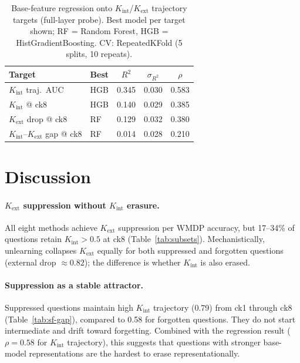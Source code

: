 \documentclass[11pt]{article}
\begin{document}
\begin{table}[t]
\centering
\caption{Base-feature regression onto $K_\text{int}$/$K_\text{ext}$ trajectory
targets (full-layer probe). Best model per target shown; RF = Random Forest,
HGB = HistGradientBoosting. CV: RepeatedKFold (5 splits, 10 repeats).}
\label{tab:regression}
\small
\setlength{\tabcolsep}{5pt}
\begin{tabular}{llccc}
\toprule
\textbf{Target} & \textbf{Best} & $R^2$ & $\sigma_{R^2}$ & $\rho$ \\
\midrule
$K_\text{int}$ traj.\ AUC     & HGB   & 0.345 & 0.030 & 0.583 \\
$K_\text{int}$ @ ck8          & HGB   & 0.140 & 0.029 & 0.385 \\
$K_\text{ext}$ drop @ ck8     & RF    & 0.129 & 0.032 & 0.380 \\
$K_\text{int}$--$K_\text{ext}$ gap @ ck8 & RF & 0.014 & 0.028 & 0.210 \\
\bottomrule
\end{tabular}
\end{table}

\section{Discussion}
\label{sec:discussion}

\paragraph{$K_\text{ext}$ suppression without $K_\text{int}$ erasure.}
All eight methods achieve $K_\text{ext}$ suppression per WMDP accuracy, but
17--34\% of questions retain $K_\text{int} > 0.5$ at ck8
(Table~\ref{tab:subsets}).
Mechanistically, unlearning collapses $K_\text{ext}$ equally for both suppressed
and forgotten questions (external drop $\approx 0.82$); the difference is
whether $K_\text{int}$ is also erased.

\paragraph{Suppression as a stable attractor.}
Suppressed questions maintain high $K_\text{int}$ trajectory (0.79) from ck1
through ck8 (Table~\ref{tab:sf-gap}), compared to 0.58 for forgotten questions.
They do not start intermediate and drift toward forgetting.
Combined with the regression result ($\rho = 0.58$ for $K_\text{int}$
trajectory), this suggests that questions with stronger base-model representations
are the hardest to erase representationally.
\end{document}
